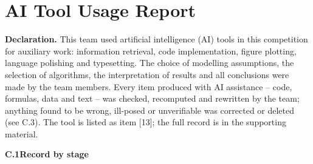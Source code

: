 \section{AI Tool Usage Report}

{\footnotesize
\setlength{\tabcolsep}{2.5pt}
\renewcommand{\arraystretch}{1.03}

\noindent\textbf{Declaration.}
This team used artificial intelligence (AI) tools in this competition for auxiliary work: information retrieval, code implementation, figure plotting, language polishing and typesetting. The choice of modelling assumptions, the selection of algorithms, the interpretation of results and all conclusions were made by the team members. Every item produced with AI assistance -- code, formulas, data and text -- was checked, recomputed and rewritten by the team; anything found to be wrong, ill-posed or unverifiable was corrected or deleted (see C.3). The tool is listed as item [13]; the full record is in the supporting material.

\vspace{4pt}
\noindent\textbf{C.1\quad Record by stage}

}
